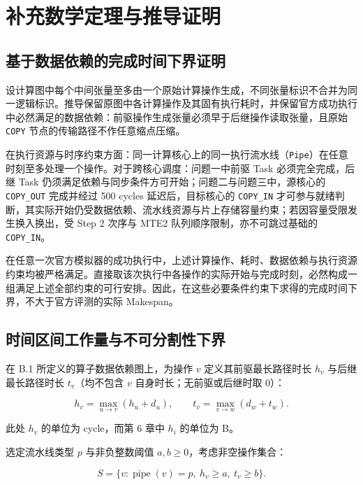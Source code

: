 \documentclass[anonymous,withtoc]{gmcm2026}
\begin{document}
\section{补充数学定理与推导证明}

\subsection{基于数据依赖的完成时间下界证明}

设计算图中每个中间张量至多由一个原始计算操作生成，不同张量标识不合并为同一逻辑标识。推导保留原图中各计算操作及其固有执行耗时，并保留官方成功执行中必然满足的数据依赖：前驱操作生成张量必须早于后继操作读取张量，且原始 \texttt{COPY} 节点的传输路径不作任意缩点压缩。

在执行资源与时序约束方面：同一计算核心上的同一执行流水线（\texttt{Pipe}）在任意时刻至多处理一个操作。对于跨核心调度：问题一中前驱 Task 必须完全完成，后继 Task 仍须满足依赖与同步条件方可开始；问题二与问题三中，源核心的 \texttt{COPY\_OUT} 完成并经过 500 cycles 延迟后，目标核心的 \texttt{COPY\_IN} 才可参与就绪判断，其实际开始仍受数据依赖、流水线资源与片上存储容量约束；若因容量受限发生换入换出，受 Step 2 次序与 MTE2 队列顺序限制，亦不可跳过基础的 \texttt{COPY\_IN}。

在任意一次官方模拟器的成功执行中，上述计算操作、耗时、数据依赖与执行资源约束均被严格满足。直接取该次执行中各操作的实际开始与完成时刻，必然构成一组满足上述全部约束的可行安排。因此，在这些必要条件约束下求得的完成时间下界，不大于官方评测的实际 Makespan。

\subsection{时间区间工作量与不可分割性下界}

在 B.1 所定义的算子数据依赖图上，为操作 \(v\) 定义其前驱最长路径时长 \(h_v\) 与后继最长路径时长 \(t_v\)（均不包含 \(v\) 自身时长；无前驱或后继时取 0）：

\begin{equation}
h_v = \max_{u \to v}(h_u + d_u), \qquad t_v = \max_{v \to w}(d_w + t_w).
\end{equation}

此处 \(h_v\) 的单位为 cycle，而第 6 章中 \(h_i\) 的单位为 B。

选定流水线类型 \(p\) 与非负整数阈值 \(a, b \ge 0\)，考虑非空操作集合：

\begin{equation}
S = \{v: \operatorname{pipe}(v) = p, \ h_v \ge a, \ t_v \ge b\}.
\end{equation}
\end{document}
